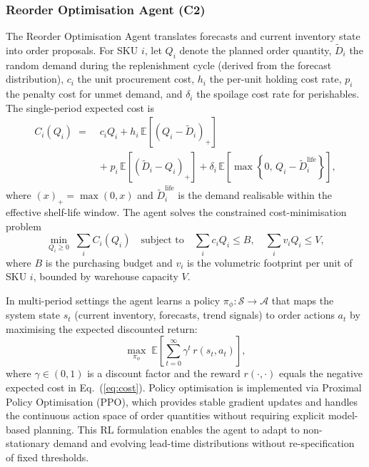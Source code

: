 \documentclass[utf8]{FrontiersinHarvard}
\begin{document}
	\subsubsection{Reorder Optimisation Agent (C2)}

	The Reorder Optimisation Agent translates forecasts and current inventory
	state into order proposals.  For SKU $i$, let $Q_i$ denote the planned
	order quantity, $\tilde{D}_i$ the random demand during the replenishment
	cycle (derived from the forecast distribution), $c_i$ the unit procurement
	cost, $h_i$ the per-unit holding cost rate, $p_i$ the penalty cost for
	unmet demand, and $\delta_i$ the spoilage cost rate for perishables.  The
	single-period expected cost is
	\begin{equation}
		\label{eq:cost}
		\begin{aligned}
			C_i(Q_i) \;=\;&
			c_i Q_i
			+ h_i\,\mathbb{E}\!\left[(Q_i - \tilde{D}_i)_+\right]\\
			&+\; p_i\,\mathbb{E}\!\left[(\tilde{D}_i - Q_i)_+\right]
			+ \delta_i\,\mathbb{E}\!\left[\max\!\left\{0,\,Q_i - \tilde{D}_i^{\text{life}}\right\}\right],
		\end{aligned}
	\end{equation}
	where $(x)_+ = \max(0,x)$ and $\tilde{D}_i^{\text{life}}$ is the demand
	realisable within the effective shelf-life window.  The agent solves the
	constrained cost-minimisation problem
	\begin{equation}
		\label{eq:optim}
		\min_{Q_i \ge 0}\; \sum_{i} C_i(Q_i)
		\quad\text{subject to}\quad
		\sum_i c_i Q_i \le B,\quad
		\sum_i v_i Q_i \le V,
	\end{equation}
	where $B$ is the purchasing budget and $v_i$ is the volumetric footprint
	per unit of SKU $i$, bounded by warehouse capacity $V$.

	In multi-period settings the agent learns a policy
	$\pi_\phi : \mathcal{S} \to \mathcal{A}$ that maps the system state $s_t$
	(current inventory, forecasts, trend signals) to order actions $a_t$ by
	maximising the expected discounted return:
	\begin{equation}
		\label{eq:rl}
		\max_{\pi_\phi}\;\mathbb{E}\!\left[\sum_{t=0}^{\infty}\gamma^{t}\,r(s_t,a_t)\right],
	\end{equation}
	where $\gamma \in (0,1)$ is a discount factor and the reward
	$r(\cdot,\cdot)$ equals the negative expected cost in
	Eq.~(\ref{eq:cost}).  Policy optimisation is implemented via Proximal
	Policy Optimisation (PPO), which provides stable gradient updates and
	handles the continuous action space of order quantities without requiring
	explicit model-based planning.  This RL formulation enables the agent to
	adapt to non-stationary demand and evolving lead-time distributions without
	re-specification of fixed thresholds.
\end{document}
